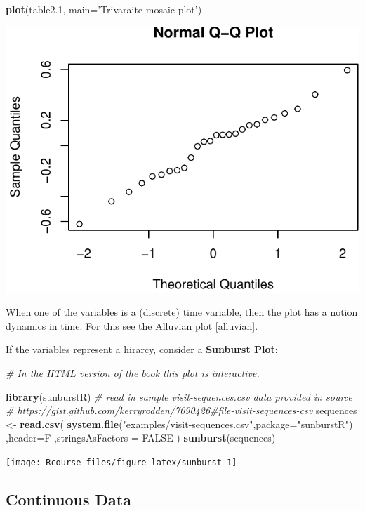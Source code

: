 \documentclass[]{book}
\newenvironment{Shaded}{\begin{snugshade}}{\end{snugshade}}
\newcommand{\KeywordTok}[1]{\textcolor[rgb]{0.13,0.29,0.53}{\textbf{#1}}}
\newcommand{\DataTypeTok}[1]{\textcolor[rgb]{0.13,0.29,0.53}{#1}}
\newcommand{\DecValTok}[1]{\textcolor[rgb]{0.00,0.00,0.81}{#1}}
\newcommand{\StringTok}[1]{\textcolor[rgb]{0.31,0.60,0.02}{#1}}
\newcommand{\CommentTok}[1]{\textcolor[rgb]{0.56,0.35,0.01}{\textit{#1}}}
\newcommand{\OtherTok}[1]{\textcolor[rgb]{0.56,0.35,0.01}{#1}}
\newcommand{\NormalTok}[1]{#1}
\theoremstyle{definition}
\theoremstyle{definition}
\theoremstyle{definition}
\theoremstyle{remark}
\begin{document}
\begin{Shaded}
\begin{Highlighting}[]
\KeywordTok{plot}\NormalTok{(table2.}\DecValTok{1}\NormalTok{, }\DataTypeTok{main=}\StringTok{'Trivaraite mosaic plot'}\NormalTok{)}
\end{Highlighting}
\end{Shaded}

\includegraphics[width=0.5\linewidth]{Rcourse_files/figure-latex/unnamed-chunk-114-1}

When one of the variables is a (discrete) time variable, then the plot
has a notion dynamics in time. For this see the Alluvian plot
\ref{alluvian}.

If the variables represent a hirarcy, consider a \textbf{Sunburst Plot}:

\begin{Shaded}
\begin{Highlighting}[]
\CommentTok{# In the HTML version of the book this plot is interactive.}

\KeywordTok{library}\NormalTok{(sunburstR)}
\CommentTok{# read in sample visit-sequences.csv data provided in source}
\CommentTok{# https://gist.github.com/kerryrodden/7090426#file-visit-sequences-csv}
\NormalTok{sequences <-}\StringTok{ }\KeywordTok{read.csv}\NormalTok{(}
  \KeywordTok{system.file}\NormalTok{(}\StringTok{"examples/visit-sequences.csv"}\NormalTok{,}\DataTypeTok{package=}\StringTok{"sunburstR"}\NormalTok{)}
\NormalTok{  ,}\DataTypeTok{header=}\NormalTok{F}
\NormalTok{  ,}\DataTypeTok{stringsAsFactors =} \OtherTok{FALSE}
\NormalTok{)}
\KeywordTok{sunburst}\NormalTok{(sequences)}
\end{Highlighting}
\end{Shaded}

\texttt{[image: Rcourse\_files/figure-latex/sunburst-1]}

\subsection{Continuous Data}\label{continuous-data}
\end{document}
